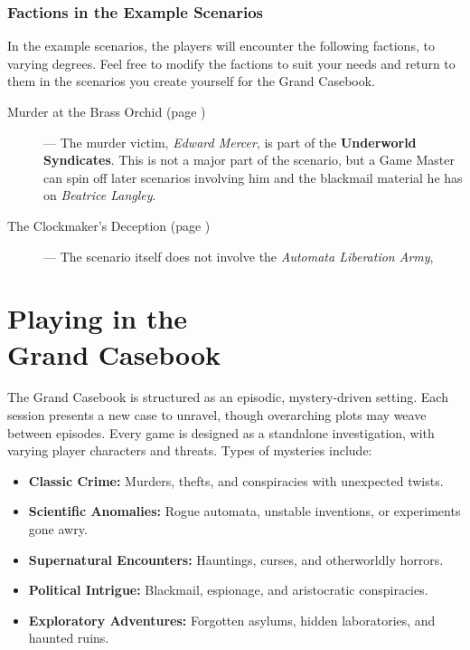 \subsubsection{Factions in the Example Scenarios}
In the example scenarios, the players will encounter the following factions, to varying degrees. Feel free to modify the factions to suit your needs and return to them in the scenarios you create yourself for the Grand Casebook.
\begin{description}
    \item[Murder at the Brass Orchid (page \pageref{scenario:murder-at-the-brass-orchid})] --- The murder victim, \emph{Edward Mercer}, is part of the \textbf{Underworld Syndicates}. This is not a major part of the scenario, but a Game Master can spin off later scenarios involving him and the blackmail material he has on \emph{Beatrice Langley}.
    
    \item[The Clockmaker's Deception (page \pageref{scenario:clockmakers-deception})] --- The scenario itself does not involve the \emph{Automata Liberation Army}, 
\end{description}






\section[Playing in the Grand Casebook]{Playing in the\\ Grand Casebook}

The Grand Casebook is structured as an episodic, mystery-driven setting. Each session presents a new case to unravel, though overarching plots may weave between episodes. Every game is designed as a standalone investigation, with varying player characters and threats. Types of mysteries include:

\begin{itemize}
    \item \textbf{Classic Crime:} Murders, thefts, and conspiracies with unexpected twists.
    \item \textbf{Scientific Anomalies:} Rogue automata, unstable inventions, or experiments gone awry.
    \item \textbf{Supernatural Encounters:} Hauntings, curses, and otherworldly horrors.
    \item \textbf{Political Intrigue:} Blackmail, espionage, and aristocratic conspiracies.
    \item \textbf{Exploratory Adventures:} Forgotten asylums, hidden laboratories, and haunted ruins.
\end{itemize}

